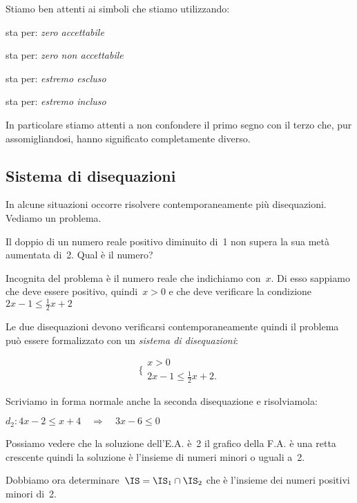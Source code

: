 

Stiamo ben attenti ai simboli che stiamo utilizzando: 
 
sta per: \emph{zero accettabile}
 
sta per: \emph{zero non accettabile}
 
sta per: \emph{estremo escluso}
 
sta per: \emph{estremo incluso}

In particolare stiamo attenti a non confondere il primo segno 
con il terzo che, pur assomigliandosi, 
hanno significato completamente diverso.

\subsection{Sistema di disequazioni}
\label{sec:dis_sistemi}

In alcune situazioni occorre risolvere contemporaneamente più
disequazioni. Vediamo un problema.

\begin{problema}
Il doppio di un numero reale positivo diminuito di~1 non supera la sua
metà aumentata di~2. Qual è il numero?
\end{problema}

Incognita del problema è il numero reale che indichiamo con~$x$. Di esso
sappiamo che deve essere positivo, quindi~$x>0$ e che deve verificare
la condizione~$2x-1\le \frac{1}{2}x+2$

Le due disequazioni devono verificarsi contemporaneamente quindi 
il problema può essere formalizzato con un \emph{sistema di disequazioni}:

\[\bigg \{%
\begin{array}{l}
 x>0\\
 2x-1\le\frac{1}{2}x+2.
\end{array}\]

Scriviamo in forma normale anche la seconda disequazione e risolviamola:

$d_2:4x-2\le x+4 \quad \Rightarrow \quad 3x -6 \le 0$

Possiamo vedere che la soluzione dell'E.A. è~2 
il grafico della F.A. è una retta crescente
quindi la soluzione è l'insieme di numeri minori o uguali a~2.

Dobbiamo ora determinare~$\IS=\IS_{1}\cap\IS_{2}$ che è l'insieme
dei numeri positivi minori di~2.

